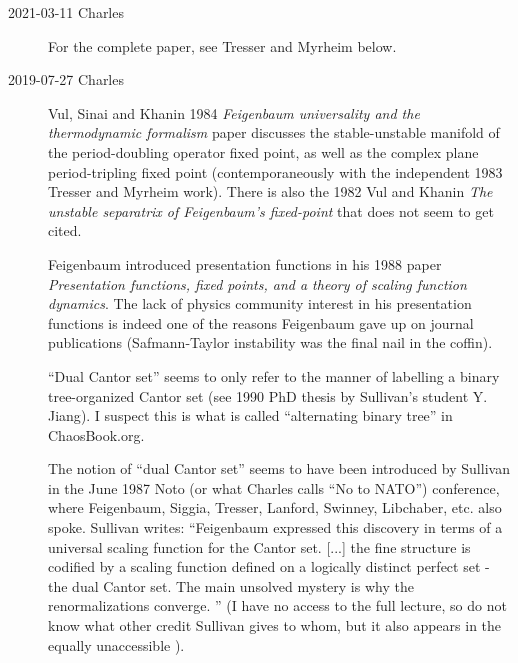 \begin{description}
  \item[2021-03-11 Charles]
For the complete paper, see {Tresser and Myrheim} below.
  \item[2019-07-27 Charles]
Vul, Sinai and Khanin 1984 {\em Feigenbaum universality and
the thermodynamic formalism} paper discusses the stable-unstable manifold
of the period-doubling operator fixed point, as well as the complex plane
period-tripling fixed point (contemporaneously with the independent 1983
Tresser and Myrheim work). There is also the
1982 Vul and Khanin {\em The unstable separatrix of
{Feigenbaum}'s fixed-point} that does not seem to get cited.

Feigenbaum introduced presentation functions in his 1988
paper {\em Presentation functions, fixed points, and a
theory of scaling function dynamics}. The lack of physics community
interest in his presentation functions is indeed one of the reasons
Feigenbaum gave up on journal publications
(Safmann-Taylor instability was the final nail in the
coffin).

``Dual Cantor set'' {seems to only} refer to the manner of labelling a
binary tree-organized Cantor set (see 1990 PhD thesis by Sullivan's
student
{Y. Jiang}). I suspect this is what is called ``alternating  binary
tree'' in
{ChaosBook.org}.

The notion of ``dual Cantor set'' seems to have been introduced by
Sullivan in the June 1987 Noto (or what Charles calls ``No
to NATO'') conference, where Feigenbaum, Siggia,
Tresser, Lanford, Swinney, Libchaber, etc. also spoke. Sullivan
writes: ``Feigenbaum expressed this discovery in terms of a universal
scaling function for the Cantor set. [...] the fine structure is codified
by a scaling function defined on a logically distinct perfect set - the
dual Cantor set. The main unsolved mystery is why the renormalizations
converge. '' (I have no access to the full lecture, so do not know what
other credit Sullivan gives to whom, but it also appears in the equally
unaccessible ).


\end{description}
